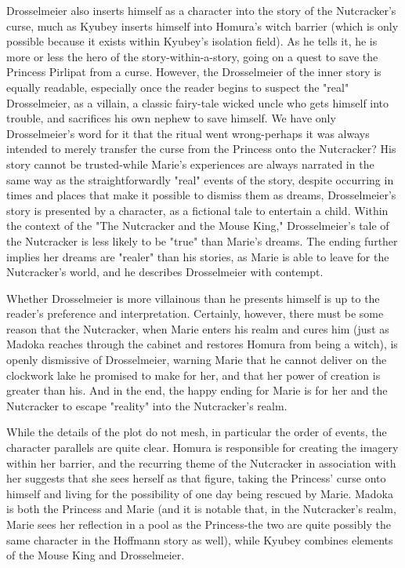 Drosselmeier also inserts himself as a character into the story of the Nutcracker's curse, much as Kyubey inserts himself into Homura's witch barrier (which is only possible because it exists within Kyubey's isolation field). As he tells it, he is more or less the hero of the story-within-a-story, going on a quest to save the Princess Pirlipat from a curse. However, the Drosselmeier of the inner story is equally readable, especially once the reader begins to suspect the "real" Drosselmeier, as a villain, a classic fairy-tale wicked uncle who gets himself into trouble, and sacrifices his own nephew to save himself. We have only Drosselmeier's word for it that the ritual went wrong-perhaps it was always intended to merely transfer the curse from the Princess onto the Nutcracker? His story cannot be trusted-while Marie's experiences are always narrated in the same way as the straightforwardly "real" events of the story, despite occurring in times and places that make it possible to dismiss them as dreams, Drosselmeier's story is presented by a character, as a fictional tale to entertain a child. Within the context of the "The Nutcracker and the Mouse King," Drosselmeier's tale of the Nutcracker is less likely to be "true" than Marie's dreams. The ending further implies her dreams are "realer" than his stories, as Marie is able to leave for the Nutcracker's world, and he describes Drosselmeier with contempt.

Whether Drosselmeier is more villainous than he presents himself is up to the reader's preference and interpretation. Certainly, however, there must be some reason that the Nutcracker, when Marie enters his realm and cures him (just as Madoka reaches through the cabinet and restores Homura from being a witch), is openly dismissive of Drosselmeier, warning Marie that he cannot deliver on the clockwork lake he promised to make for her, and that her power of creation is greater than his. And in the end, the happy ending for Marie is for her and the Nutcracker to escape "reality" into the Nutcracker's realm.

While the details of the plot do not mesh, in particular the order of events, the character parallels are quite clear. Homura is responsible for creating the imagery within her barrier, and the recurring theme of the Nutcracker in association with her suggests that she sees herself as that figure, taking the Princess' curse onto himself and living for the possibility of one day being rescued by Marie. Madoka is both the Princess and Marie (and it is notable that, in the Nutcracker's realm, Marie sees her reflection in a pool as the Princess-the two are quite possibly the same character in the Hoffmann story as well), while Kyubey combines elements of the Mouse King and Drosselmeier.

